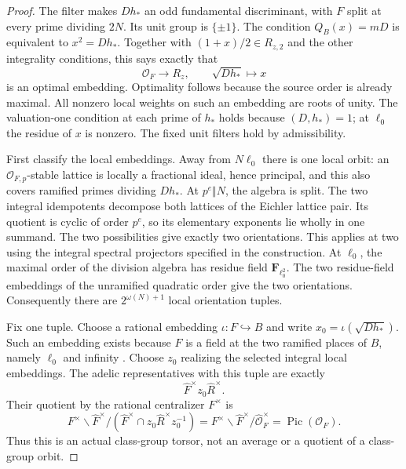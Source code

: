 \begin{proof}
The filter makes $Dh_*$ an odd fundamental discriminant, with
$F$ split at every prime dividing $2N$. Its unit group is
$\{\pm1\}$. The condition $Q_B(x)=mD$ is equivalent to
$x^2=Dh_*$. Together with $(1+x)/2\in R_{z,2}$ and the other
integrality conditions, this says exactly that
\[
 \mathcal O_F\longrightarrow R_z,
 \qquad \sqrt{Dh_*}\longmapsto x
\]
is an optimal embedding. Optimality follows because the source
order is already maximal. All nonzero local weights on such an
embedding are roots of unity. The valuation-one condition at each
prime of $h_*$ holds because $(D,h_*)=1$; at $\ell_0$ the residue
of $x$ is nonzero. The fixed unit filters hold by admissibility.

First classify the local embeddings. Away from $N\ell_0$ there
is one local orbit: an $\mathcal O_{F,p}$-stable lattice is locally
a fractional ideal, hence principal, and this also covers ramified
primes dividing $Dh_*$. At $p^e\Vert N$, the algebra is split.
The two integral idempotents decompose both lattices of the
Eichler lattice pair. Its quotient is cyclic of order $p^e$,
so its elementary exponents lie wholly in one summand. The two
possibilities give exactly two orientations. This applies at two
using the integral spectral projectors specified in the construction.
At $\ell_0$, the maximal order of the division algebra has residue
field $\mathbf F_{\ell_0^2}$. The two residue-field embeddings
of the unramified quadratic order give the two orientations.
Consequently there are $2^{\omega(N)+1}$ local orientation tuples.

Fix one tuple. Choose a rational embedding
$\iota:F\hookrightarrow B$ and write $x_0=\iota(\sqrt{Dh_*})$.
Such an embedding exists because $F$ is a field at the two ramified
places of $B$, namely $\ell_0$ and infinity
\cite[Proposition 14.6.7, $(v)\Rightarrow(iii)$]{voight-quaternion}.
Choose $z_0$ realizing
the selected integral local embeddings. The adelic representatives
with this tuple are exactly
\[
       \widehat F^{\times}z_0\widehat R^{\times}.
\]
Their quotient by the rational centralizer $F^{\times}$ is
\[
 F^{\times}\backslash\widehat F^{\times}/
      (\widehat F^{\times}\cap z_0\widehat R^{\times}z_0^{-1})
 =F^{\times}\backslash\widehat F^{\times}/\widehat{\mathcal O}_F^{\times}
 =\operatorname{Pic}(\mathcal O_F).
\]
Thus this is an actual class-group torsor, not an average or a
quotient of a class-group orbit.


\end{proof}
